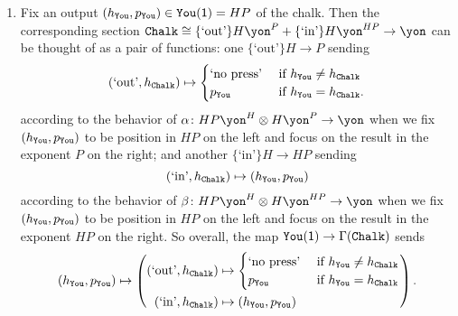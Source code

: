 \documentclass[Book-Poly]{subfiles}
\begin{document}
\begin{exercise}
\begin{solution}
\begin{enumerate}
    \item Fix an output $(h_{\texttt{You}},p_{\texttt{You}})\in\texttt{You}(\textsf{1})=HP$ of the chalk.
    Then the corresponding section $\const{Chalk}\iso\{\text{`out'}\}H\yon^P + \{\text{`in'}\}H\yon^{HP}\to\yon$ can be thought of as a pair of functions: one $\{\text{`out'}\}H\to P$ sending
    \[
        (\text{`out'},h_{\texttt{Chalk}})\mapsto
            \begin{cases}
  	            \text{`no press'} & \textnormal{ if } h_{\texttt{You}} \neq h_{\texttt{Chalk}} \\
  	            p_{\texttt{You}} & \textnormal{ if } h_{\texttt{You}} = h_{\texttt{Chalk}}.
            \end{cases}
    \]
    according to the behavior of $\alpha\colon HP\yon^H\otimes H\yon^P\to\yon$ when we fix $(h_{\texttt{You}},p_{\texttt{You}})$ to be position in $HP$ on the left and focus on the result in the exponent $P$ on the right; and another $\{\text{`in'}\}H\to HP$ sending
    \[
        (\text{`in'},h_{\texttt{Chalk}})\mapsto(h_{\texttt{You}},p_{\texttt{You}})
    \]
    according to the behavior of $\beta\colon HP\yon^H\otimes H\yon^{HP}\to\yon$ when we fix $(h_{\texttt{You}},p_{\texttt{You}})$ to be position in $HP$ on the left and focus on the result in the exponent $HP$ on the right.
    So overall, the map $\texttt{You}(\textsf{1})\to\Gamma(\texttt{Chalk})$ sends
    \[
        (h_{\texttt{You}},p_{\texttt{You}})\mapsto\left(
            \begin{aligned}
                (\text{`out'},h_{\texttt{Chalk}})&\mapsto
                    \begin{cases}
          	            \text{`no press'} & \textnormal{ if } h_{\texttt{You}} \neq h_{\texttt{Chalk}} \\
          	            p_{\texttt{You}} & \textnormal{ if } h_{\texttt{You}} = h_{\texttt{Chalk}}
                    \end{cases} \\
                (\text{`in'},h_{\texttt{Chalk}})&\mapsto(h_{\texttt{You}},p_{\texttt{You}})
            \end{aligned}
        \right).
    \]
\end{enumerate}
\end{solution}
\end{exercise}
\end{document}
